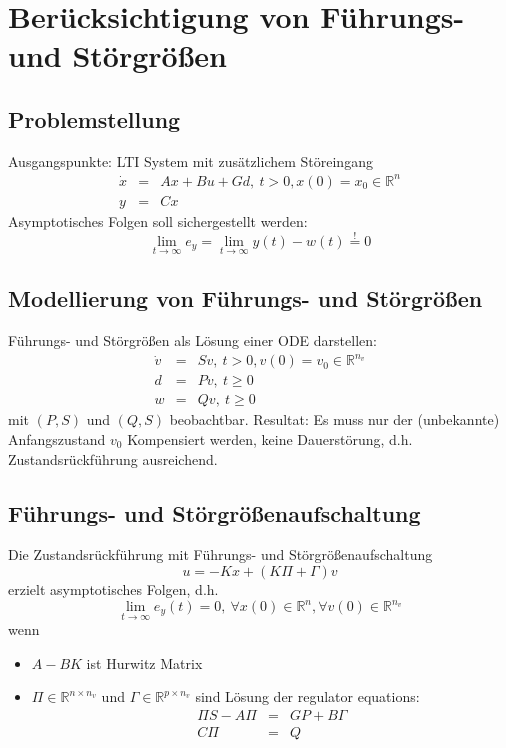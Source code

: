 \chapter{Berücksichtigung von Führungs- und Störgrößen}
\section{Problemstellung}
Ausgangspunkte: LTI System mit zusätzlichem Störeingang
\begin{eqnarray}
    \dot{x} &=& Ax + Bu + Gd,\ t>0, x(0)=x_0 \in \mathbb{R}^n \\
    y &=& C x
\end{eqnarray}
Asymptotisches Folgen soll sichergestellt werden:
\begin{equation}
    \lim_{t \to \infty} e_y = \lim_{t \to \infty} y(t) - w(t) \stackrel{!}{=} 0 
\end{equation}

\section{Modellierung von Führungs- und Störgrößen}
Führungs- und Störgrößen als Lösung einer ODE darstellen:
\begin{eqnarray}
    \dot{v} &=& Sv,\ t>0, v(0)=v_0\in \mathbb{R}^{n_v} \\
    d &=& Pv,\ t \geq 0 \\
    w &=& Qv,\ t \geq 0
\end{eqnarray} 
mit $(P,S)$ und $(Q,S)$ beobachtbar. Resultat: Es muss nur der (unbekannte) Anfangszustand
$v_0$ Kompensiert werden, keine Dauerstörung, d.h. Zustandsrückführung ausreichend.


\section{Führungs- und Störgrößenaufschaltung}
Die Zustandsrückführung mit Führungs- und Störgrößenaufschaltung
\begin{equation}
    u = -Kx + (K \Pi + \Gamma) v
\end{equation}
erzielt asymptotisches Folgen, d.h.
\begin{equation}
    \lim_{t \to \infty} e_y(t) = 0,\ \forall x(0) \in \mathbb{R}^n, \forall v(0) \in
        \mathbb{R}^{n_v}
\end{equation}
wenn
\begin{itemize}
    \item $A-BK$ ist Hurwitz Matrix
    \item $\Pi \in \mathbb{R}^{n\times n_v}$ und $\Gamma \in \mathbb{R}^{p \times n_v}$ sind Lösung der \glqq{}regulator equations\grqq{}:
        \begin{eqnarray}
            \Pi S - A \Pi &=& GP + B \Gamma \\
            C \Pi &=& Q
        \end{eqnarray}
\end{itemize}

